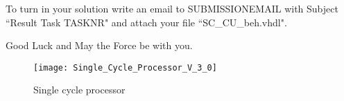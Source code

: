 \documentclass[a4paper,12pt]{article}
\begin{document}
To turn in your solution write an email to {{SUBMISSIONEMAIL}} with Subject ``Result Task {{TASKNR}}" and attach your file ``SC\_CU\_beh.vhdl".

\vspace{0.7cm}
Good Luck and May the Force be with you.

\begin{landscape}
\begin{figure}[!h]
\vspace{-0.5cm}
\hspace{-1.8cm}
\texttt{[image: Single\_Cycle\_Processor\_V\_3\_0]}
\caption{Single cycle processor}
\label{fig:SingleCycleProcessor}
\end{figure}
\end{landscape}
\end{document}
